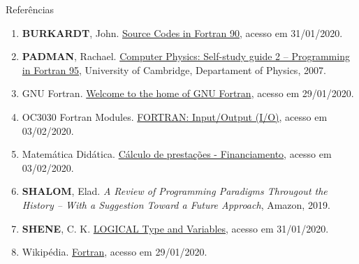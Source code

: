 \begin{frame}[fragile]{Referências}

    \begin{enumerate}
        \item \textbf{BURKARDT}, John. \href{https://people.sc.fsu.edu/~jburkardt/f_src/f_src.html}{Source Codes in Fortran 90}, acesso em 31/01/2020.
 
        \item \textbf{PADMAN}, Rachael. \href{http://www.mrao.cam.ac.uk/~rachael/compphys/SelfStudyF95.pdf}{Computer Physics: Self-study guide 2 -- Programming in Fortran 95}, University of 
        Cambridge, Departament of Physics, 2007.

        \item GNU Fortran. \href{https://gcc.gnu.org/fortran/}{Welcome to the home of GNU Fortran},
            acesso em 29/01/2020.

        \item OC3030 Fortran Modules. \href{https://www.oc.nps.edu/~bird/oc3030_online/fortran/io/io.html}{FORTRAN: Input/Output (I/O)}, acesso em 03/02/2020.
  
        \item Matemática Didática. \href{http://www.matematicadidatica.com.br/CalculoPrestacao.aspx}{Cálculo de prestações - Financiamento}, acesso em 03/02/2020.
 
        \item \textbf{SHALOM}, Elad. \textit{A Review of Programming Paradigms Througout the 
            History -- With a Suggestion Toward a Future Approach}, Amazon, 2019.

        \item \textbf{SHENE}, C. K. \href{https://pages.mtu.edu/~shene/COURSES/cs201/NOTES/chap03/log-type.html}{LOGICAL Type and Variables}, acesso em 31/01/2020.

        \item Wikipédia. \href{https://pt.wikipedia.org/wiki/Fortran}{Fortran}, acesso em 
            29/01/2020.
 
    \end{enumerate}

\end{frame}
